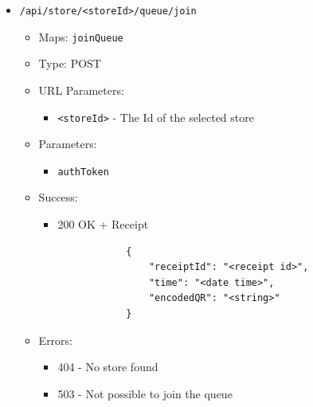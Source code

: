 \begin{itemize}
    \item \texttt{/api/store/<storeId>/queue/join}
    \begin{itemize}
        \item Maps: \texttt{joinQueue}
        \item Type: POST
        \item URL Parameters:
        \begin{itemize}
            \item \texttt{<storeId>} - The Id of the selected store
        \end{itemize}
        \item Parameters:
        \begin{itemize}
            \item \texttt{authToken}
        \end{itemize}
        \item Success:
        \begin{itemize}
            \item 200 OK + Receipt
            \begin{lstlisting}
            {
                "receiptId": "<receipt id>",
                "time": "<date time>",
                "encodedQR": "<string>"
            }
            \end{lstlisting}
        \end{itemize}
        \item Errors:
        \begin{itemize}
            \item 404 - No store found
            \item 503 - Not possible to join the queue
        \end{itemize}
    \end{itemize}
  

\end{itemize}
